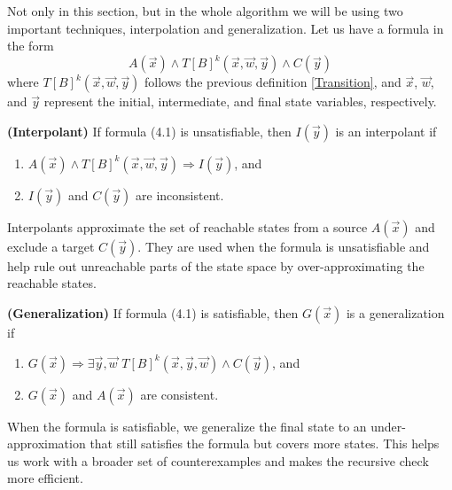 \vspace{\baselineskip}\noindent
Not only in this section, but in the whole algorithm we will be using two important techniques, interpolation and generalization. 
Let us have a formula in the form
\begin{equation}
    A(\vec{x}) \wedge T[B]^k(\vec{x},\vec{w},\vec{y}) \wedge C(\vec{y})
\end{equation}
where \( T[B]^k(\vec{x}, \vec{w}, \vec{y}) \) follows the previous definition \ref{Transition}, and \( \vec{x} \), \( \vec{w} \), and \( \vec{y} \) represent the initial, intermediate, and final state variables, respectively.


\vspace{\baselineskip}
\begin{definition}{\textbf{(Interpolant)}}
    \cite{7886665} If formula (4.1) is unsatisfiable, then $I(\vec{y})$ is an interpolant if
    \label{interpolation}
    \begin{enumerate}
        \item \( A(\vec{x}) \land T[B]^k(\vec{x}, \vec{w}, \vec{y}) \Rightarrow I(\vec{y}) \), and
        \item \( I(\vec{y}) \) and \( C(\vec{y}) \) are inconsistent.
    \end{enumerate}
\end{definition}
Interpolants approximate the set of reachable states from a source \( A(\vec{x}) \) and exclude a target \( C(\vec{y}) \). They are used when the formula is unsatisfiable and help rule out unreachable parts of the state space by over-approximating the reachable states.


\vspace{\baselineskip}
\begin{definition}{\textbf{(Generalization)}}
    \cite{7886665} If formula (4.1) is satisfiable, then $G(\vec{x})$ is a generalization if
    \label{generalization}
    \begin{enumerate}
        \item $G(\vec{x}) \Rightarrow \exists \vec{y}, \vec{w}$  $T[B]^k(\vec{x}, \vec{y}, \vec{w}) \wedge C(\vec{y})$, and
        \item $G(\vec{x})$ and $A(\vec{x})$ are consistent.
    \end{enumerate}
\end{definition}
When the formula is satisfiable, we generalize the final state to an under-approximation that still satisfies the formula but covers more states. This helps us work with a broader set of counterexamples and makes the recursive check more efficient.


